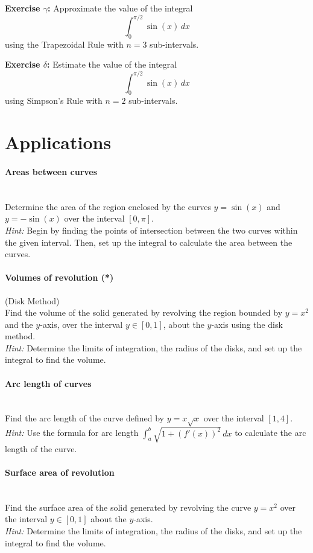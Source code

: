 \documentclass[]{article}
\begin{document}
	\textbf{Exercise $\gamma$:}
	Approximate the value of the integral
	\[
	\int_0^{\pi/2} \sin(x) \, dx
	\]
	using the Trapezoidal Rule with \(n = 3\) sub-intervals.
	
	\textbf{Exercise $\delta$:}
	Estimate the value of the integral
	\[
	\int_0^{\pi/2} \sin(x) \, dx
	\]
	using Simpson's Rule with \(n = 2\) sub-intervals.
	
	
	\section{Applications}
	\paragraph{Areas between curves}\mbox{}\\
	Determine the area of the region enclosed by the curves \(y = \sin(x)\) and \(y = -\sin(x)\) over the interval \([0, \pi]\).\\
	\textit{Hint:} Begin by finding the points of intersection between the two curves within the given interval.
	Then, set up the integral to calculate the area between the curves.
	
	\paragraph{Volumes of revolution (*)} (Disk Method)\\
	Find the volume of the solid generated by revolving the region bounded by \(y = x^2\) and the $y$-axis, over the interval \( y\in [0, 1] \), about the $y$-axis using the disk method.\\
	\textit{Hint:} Determine the limits of integration, the radius of the disks, and set up the integral to find the volume.
	
	\paragraph{Arc length of curves}\mbox{}\\
	Find the arc length of the curve defined by \(y = x\sqrt{x}\) over the interval \([1, 4]\).\\
	\textit{Hint:} Use the formula for arc length \(\int_a^b \sqrt{1 + (f'(x))^2} \, dx\) to calculate the arc length of the curve.
	
	\paragraph{Surface area of revolution}\mbox{}\\
	Find the surface area of the solid generated by revolving the curve \(y = x^2\) over the interval \( y \in [0, 1] \) about the $y$-axis.\\
	\textit{Hint:} Determine the limits of integration, the radius of the disks, and set up the integral to find the volume.
	
\end{document}
